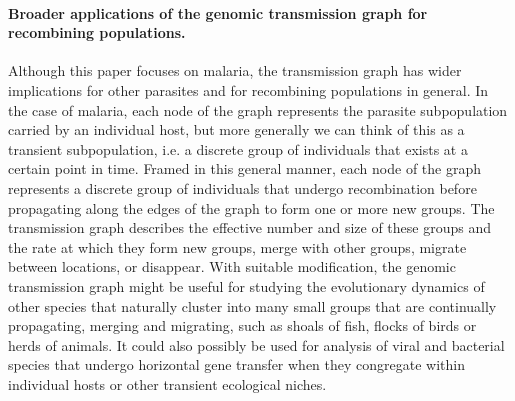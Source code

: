 \documentclass[_main.tex]{subfiles}
\begin{document}
\paragraph{Broader applications of the genomic transmission graph for recombining populations.}  Although this paper focuses on malaria, the transmission graph has wider implications for other parasites and for recombining populations in general.  In the case of malaria, each node of the graph represents the parasite subpopulation carried by an individual host, but more generally we can think of this as a transient subpopulation, i.e. a discrete group of individuals that exists at a certain point in time.  Framed in this general manner, each node of the graph represents a discrete group of individuals that undergo recombination before propagating along the edges of the graph to form one or more new groups.  The transmission graph describes the effective number and size of these groups and the rate at which they form new groups, merge with other groups, migrate between locations, or disappear.  With suitable modification, the genomic transmission graph might be useful for studying the evolutionary dynamics of other species that naturally cluster into many small groups that are continually propagating, merging and migrating, such as shoals of fish, flocks of birds or herds of animals.  It could also possibly be used for analysis of viral and bacterial species that undergo horizontal gene transfer when they congregate within individual hosts or other transient ecological niches. 
\end{document}
